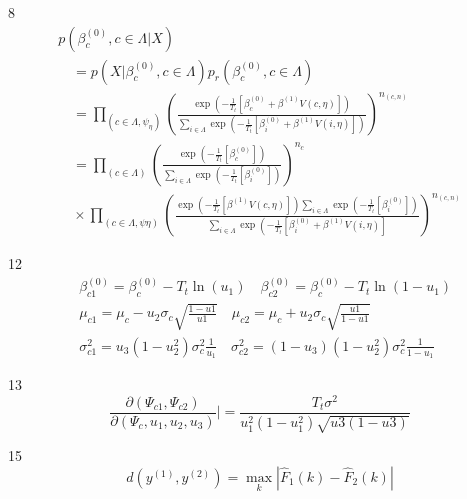 \documentclass[10pt,letterpaper]{article}
\begin{document}
8
\begin{equation}
\begin{array}{l}
p\left(\beta_{c}^{(0)}, c \in \Lambda | X\right) \\
\quad=p\left(X | \beta_{c}^{(0)}, c \in \Lambda\right) p_{r}\left(\beta_{c}^{(0)}, c \in \Lambda\right) \\
\quad=\prod_{\left(c \in \Lambda, \psi_{\eta}\right)}\left(\frac{\exp \left(-\frac{1}{T_{t}}\left[\beta_{c}^{(0)}+\beta^{(1)} V(c, \eta)\right]\right)}{\sum_{i \in \Lambda} \exp \left(-\frac{1}{T_{t}}\left[\beta_{i}^{(0)}+\beta^{(1)} V(i, \eta)\right]\right)}\right)^{n_{(c, n)}} \\
\quad=\prod_{(c \in \Lambda)}\left(\frac{\exp \left(-\frac{1}{T_{t}}\left[\beta_{c}^{(0)}\right]\right)}{\sum_{i \in \Lambda} \exp \left(-\frac{1}{T_{t}}\left[\beta_{i}^{(0)}\right]\right)}\right)^{n_{c}} \\
\quad \times \prod_{(c \in \Lambda, \psi \eta)}\left(\frac{\exp \left(-\frac{1}{T_{t}}\left[\beta^{(1)} V(c, \eta)\right]\right) \sum_{i \in \Lambda} \exp \left(-\frac{1}{T_{t}}\left[\beta_{i}^{(0)}\right]\right)}{\sum_{i \in \Lambda} \exp \left(-\frac{1}{T_{t}}\left[\beta_{i}^{(0)}+\beta^{(1)} V(i, \eta)\right]\right.}\right)^{n_{(c, n)}}
\end{array}
\end{equation}

12
\begin{equation}
\begin{aligned}
&\beta_{c 1}^{(0)}=\beta_{c}^{(0)}-T_{t} \ln \left(u_{1}\right) \quad \beta_{c 2}^{(0)}=\beta_{c}^{(0)}-T_{t} \ln \left(1-u_{1}\right)\\
&\mu_{c 1}=\mu_{c}-u_{2} \sigma_{c} \sqrt{\frac{1-u 1}{u 1}} \quad \mu_{c 2}=\mu_{c}+u_{2} \sigma_{c} \sqrt{\frac{u 1}{1-u 1}} \\
&\sigma_{c 1}^{2}=u_{3}\left(1-u_{2}^{2}\right) \sigma_{c}^{2} \frac{1}{u_{1}} \quad \sigma_{c 2}^{2}=\left(1-u_{3}\right)\left(1-u_{2}^{2}\right) \sigma_{c}^{2} \frac{1}{1-u_{1}}
\end{aligned}
\end{equation}

13
\begin{equation}
\frac{\partial\left(\Psi_{c 1}, \Psi_{c 2}\right)}{\partial\left(\Psi_{c}, u_{1}, u_{2}, u_{3}\right)} |=\frac{T_{t} \sigma^{2}}{u_{1}^{2}\left(1-u_{1}^{2}\right) \sqrt{u 3(1-u 3)}}
\end{equation}

15
\begin{equation}
d\left(y^{(1)}, y^{(2)}\right)=\max _{k}\left|\hat{F}_{1}(k)-\hat{F}_{2}(k)\right|
\end{equation}
\end{document}
